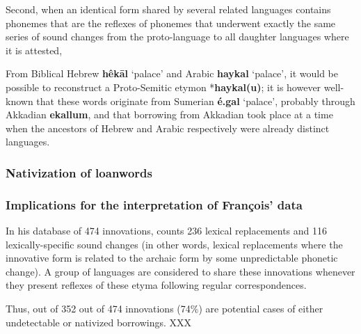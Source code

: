 \documentclass[oneside,a4paper,11pt]{article}
\newcommand{\ipa}[1]{\textbf{{\phon\mbox{#1}}}} %
\begin{document}
Second, when an identical form shared by several related languages contains phonemes that are the reflexes of phonemes that underwent exactly the same series of sound changes from the proto-language to all daughter languages where it is attested,  

From Biblical Hebrew \ipa{hêkāl} `palace' and Arabic \ipa{haykal} `palace', it would be possible to reconstruct a Proto-Semitic etymon *\ipa{haykal(u)}; it is however well-known that these words originate from Sumerian \ipa{é.gal} `palace', probably through Akkadian \ipa{ekallum}, and that borrowing from Akkadian took place at a time when the ancestors of Hebrew and Arabic respectively were already distinct languages.

\subsubsection{Nativization of loanwords}

\citet{aikio06nativization}

\subsubsection{Implications for the interpretation of François' data}
In his database of 474 innovations, \citet[177]{francois15tree} counts 236 lexical replacements and 116 lexically-specific sound changes (in other words, lexical replacements where the innovative form is related to the archaic form by some unpredictable phonetic change). A group of languages are considered to share these innovations whenever they present reflexes of these etyma following regular correspondences.

Thus, out of 352 out of 474 innovations (74\%) are potential cases of either undetectable or nativized borrowings. XXX





 
\end{document}
